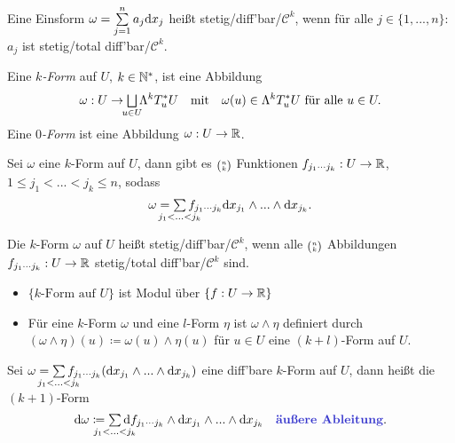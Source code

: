 \documentclass{cheat-sheet}
\let\myBinom\binom
\renewcommand{\binom}[2]{\mathsmaller{\myBinom{#1}{#2}}}
\begin{document}
\begin{defn}
  Eine Einsform $\omega = \sum_{j=1}^n a_j \d x_j$ heißt stetig/diff'bar/$\mathcal{C}^k$, wenn für alle $j \in \{ 1, ..., n \}$: $a_j$ ist stetig/total diff'bar/$\mathcal{C}^k$.
\end{defn}
\fi


\begin{defn}
  Eine \emph{$k$-Form} auf $U$, $k \in \mathbb{N}^*$, ist eine Abbildung
  \[ \omega : U \to \bigsqcup_{\mathclap{u \in U}} \Lambda^k T_u^* U \quad \text{mit} \quad \omega(u) \in \Lambda^k T_u^* U \text{ für alle } u \in U. \]
  Eine \emph{$0$-Form} ist eine Abbildung $\omega : U \to \mathbb{R}$.
\end{defn}


\begin{beobachtung}
  Sei $\omega$ eine $k$-Form auf $U$, dann gibt es $\binom{n}{k}$ Funktionen $f_{j_1 \cdots j_k} : U \to \mathbb{R}$, $1 \leq j_1 < ... < j_k \leq n$, sodass
  \[ \omega = \sum_{\mathclap{j_1 < ... < j_k}} f_{j_1 \cdots j_k} \d x_{j_1} \wedge ... \wedge \d x_{j_k}. \]
\end{beobachtung}

\begin{defn}
  Die $k$-Form $\omega$ auf $U$ heißt stetig/diff'bar/$\mathcal{C}^k$, wenn alle $\binom{n}{k}$ Abbildungen $f_{j_1 \cdots j_k} : U \to \mathbb{R}$ stetig/total diff'bar/$\mathcal{C}^k$ sind.
\end{defn}

\begin{beobachtung}
  \begin{itemize}
    \item $\{ k\text{-Form auf } U \}$ ist Modul über $\{ f : U \to \mathbb{R} \}$
    \item Für eine $k$-Form $\omega$ und eine $l$-Form $\eta$ ist $\omega \wedge \eta$ definiert durch $(\omega \wedge \eta)(u) \coloneqq \omega(u) \wedge \eta(u)$ für $u \in U$ eine $(k{+}l)$-Form auf $U$.
  \end{itemize}
\end{beobachtung}

\begin{defn}
  Sei $\omega = \sum_{\mathclap{j_1 < ... < j_k}} f_{j_1 \cdots j_k} (\d x_{j_1} \wedge ... \wedge \d x_{j_k})$ eine diff'bare $k$-Form auf $U$, dann heißt die $(k{+}1)$-Form
  \[ \d \omega \coloneqq \sum_{\mathclap{j_1 < ... < j_k}} \d f_{j_1 \cdots j_k} \wedge \d x_{j_1} \wedge ... \wedge \d x_{j_k} \quad \text{\emph{äußere Ableitung}}. \]
\end{defn}
\end{document}

